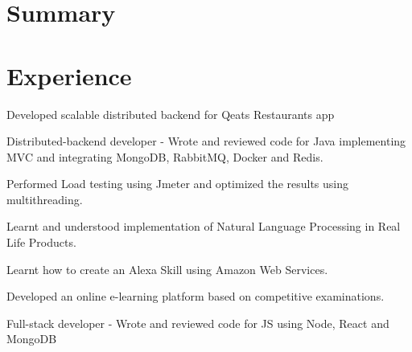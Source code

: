 \documentclass[]{surya-resume}
\begin{document}
\hfill
\begin{minipage}[t]{0.65\textwidth} 

\section{Summary}
\sectionsep

\section{Experience}
\vspace{\topsep} %
\begin{tightemize}
\item Developed scalable distributed backend for Qeats Restaurants app
\item Distributed-backend developer - Wrote and reviewed code for Java implementing MVC and integrating MongoDB, RabbitMQ, Docker and Redis.
\item Performed Load testing using Jmeter and optimized the results using multithreading.
\end{tightemize}
\sectionsep
{}
\begin{tightemize}
\item Learnt and understood implementation of Natural Language Processing in Real Life Products.
\item Learnt how to create an Alexa Skill using Amazon Web Services.
\end{tightemize}
\sectionsep
{}
\begin{tightemize}
\item Developed an online e-learning platform based on competitive examinations.
\item Full-stack developer - Wrote and reviewed code for JS using Node, React and MongoDB 

\end{tightemize}
\end{minipage}
\end{document}
